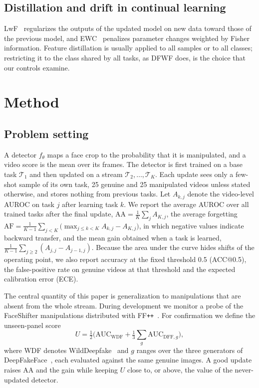 \documentclass[journal]{IEEEtran}
\newcommand{\ffpp}{FF\texttt{++}}
\begin{document}
\subsection{Distillation and drift in continual learning}
LwF~\cite{li2018lwf} regularizes the outputs of the updated model on new data toward those of the previous model, and EWC~\cite{kirkpatrick2017ewc} penalizes parameter changes weighted by Fisher information. Feature distillation is usually applied to all samples or to all classes; restricting it to the class shared by all tasks, as DFWF does, is the choice that our controls examine.

\section{Method}
\label{sec:method}

\subsection{Problem setting}
\label{sec:problem}

A detector $f_\theta$ maps a face crop to the probability that it is manipulated, and a video score is the mean over its frames. The detector is first trained on a base task $\mathcal{T}_1$ and then updated on a stream $\mathcal{T}_2,\dots,\mathcal{T}_K$. Each update sees only a few-shot sample of its own task, 25 genuine and 25 manipulated videos unless stated otherwise, and stores nothing from previous tasks. Let $A_{k,j}$ denote the video-level AUROC on task $j$ after learning task $k$. We report the average AUROC over all trained tasks after the final update, $\mathrm{AA}=\frac{1}{K}\sum_{j}A_{K,j}$, the average forgetting $\mathrm{AF}=\frac{1}{K-1}\sum_{j<K}\big(\max_{j\le k<K}A_{k,j}-A_{K,j}\big)$, in which negative values indicate backward transfer, and the mean gain obtained when a task is learned, $\frac{1}{K-1}\sum_{j\ge2}(A_{j,j}-A_{j-1,j})$. Because the area under the curve hides shifts of the operating point, we also report accuracy at the fixed threshold 0.5 (ACC@0.5), the false-positive rate on genuine videos at that threshold and the expected calibration error (ECE).

The central quantity of this paper is generalization to manipulations that are absent from the whole stream. During development we monitor a probe of the FaceShifter manipulations distributed with \ffpp{}~\cite{rossler2019faceforensics}. For confirmation we define the unseen-panel score
\begin{equation}
U=\tfrac{1}{2}\Big(\mathrm{AUC}_{\mathrm{WDF}}+\tfrac{1}{3}\sum_{g}\mathrm{AUC}_{\mathrm{DFF},g}\Big),
\end{equation}
where WDF denotes WildDeepfake~\cite{zi2020wilddeepfake} and $g$ ranges over the three generators of DeepFakeFace~\cite{song2023deepfakeface}, each evaluated against the same genuine images. A good update raises AA and the gain while keeping $U$ close to, or above, the value of the never-updated detector.
\end{document}
